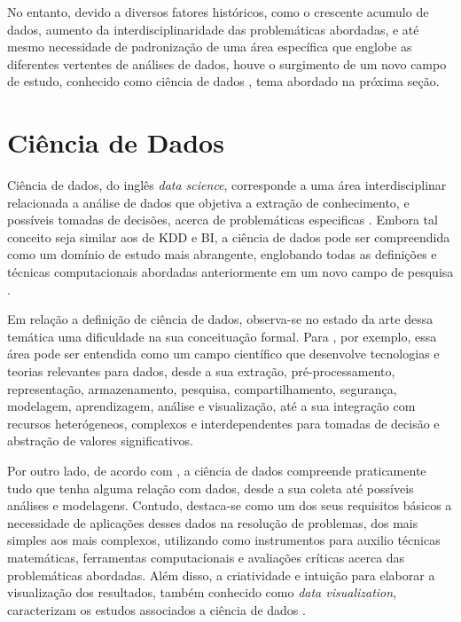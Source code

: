 No entanto, devido a diversos fatores históricos, como o crescente acumulo de dados, aumento da interdisciplinaridade das problemáticas abordadas, e até mesmo necessidade de padronização de uma área específica que englobe as diferentes vertentes de análises de dados, houve o surgimento de um novo campo de estudo, conhecido como ciência de dados \cite{cap02_ref2, cap02_ref9, cap02_ref33, cap02_ref32}, tema abordado na próxima seção.

\section{Ciência de Dados}

Ciência de dados, do inglês \textit{data science}, corresponde a uma área interdisciplinar relacionada a análise de dados que objetiva a extração de conhecimento, e possíveis tomadas de decisões, acerca de problemáticas especificas \cite{cap02_ref1, cap02_ref4}. Embora tal conceito seja similar aos de KDD e BI, a ciência de dados pode ser compreendida como um domínio de estudo mais abrangente, englobando todas as definições e técnicas computacionais abordadas anteriormente em um novo campo de pesquisa \cite{cap02_ref2}.

Em relação a definição de ciência de dados, observa-se no estado da arte dessa temática uma dificuldade na sua conceituação formal. Para \cite{cap02_ref33}, por exemplo, essa área pode ser entendida como um campo científico que desenvolve tecnologias e teorias relevantes para dados, desde a sua extração, pré-processamento, representação, armazenamento, pesquisa, compartilhamento, segurança, modelagem, aprendizagem, análise e visualização, até a sua integração com recursos heterógeneos, complexos e interdependentes para tomadas de decisão e abstração de valores significativos.

Por outro lado, de acordo com \cite{cap02_ref34}, a ciência de dados compreende praticamente tudo que tenha alguma relação com dados, desde a sua coleta até possíveis análises e modelagens. Contudo, destaca-se como um dos seus requisitos básicos a necessidade de aplicações desses dados na resolução de problemas, dos mais simples aos mais complexos, utilizando como instrumentos para auxilio técnicas matemáticas, ferramentas computacionais e avaliações críticas acerca das problemáticas abordadas. Além disso, a criatividade e intuição para elaborar a visualização dos resultados, também conhecido como \textit{data visualization}, caracterizam os estudos associados a ciência de dados \cite{cap02_ref18}.

